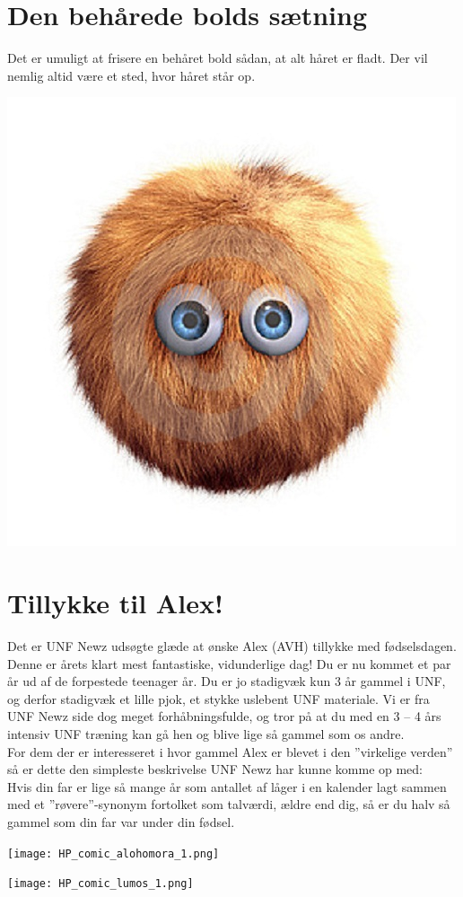 \begin{minipage}[t]{100mm}
\vspace{3mm}

\section*{Den behårede bolds sætning}

Det er umuligt at frisere en behåret bold sådan, at alt håret er fladt. Der vil nemlig altid være et sted, hvor håret står op.

\includegraphics[width=\linewidth]{hairyball.jpg}

\section*{Tillykke til Alex!}
Det er UNF Newz udsøgte glæde at ønske Alex (AVH) tillykke med fødselsdagen. Denne er årets klart mest fantastiske, vidunderlige dag! Du er nu kommet et par år ud af de forpestede teenager år. Du er jo stadigvæk kun 3 år gammel i UNF, og derfor stadigvæk et lille pjok, et stykke uslebent UNF materiale. Vi er fra UNF Newz side dog meget forhåbningsfulde, og tror på at du med en 3 – 4 års intensiv UNF træning kan gå hen og blive lige så gammel som os andre.\\
For dem der er interesseret i hvor gammel Alex er blevet i den ”virkelige verden” så er dette den simpleste beskrivelse UNF Newz har kunne komme op med: \\
Hvis din far er lige så mange år som antallet af låger i en kalender lagt sammen med et ”røvere”-synonym fortolket som talværdi, ældre end dig, så er du halv så gammel som din far var under din fødsel.


\texttt{[image: HP\_comic\_alohomora\_1.png]}

\vline

\texttt{[image: HP\_comic\_lumos\_1.png]}

\end{minipage}
